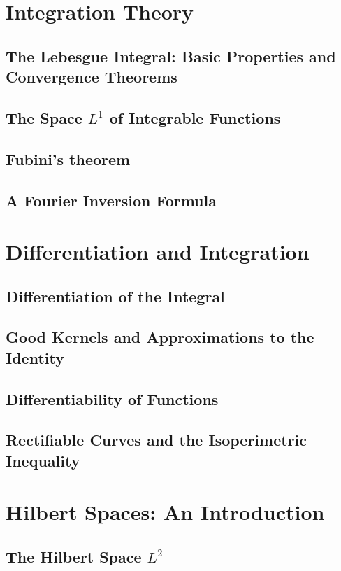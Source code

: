 \documentclass[12pt, a4paper, openany, twoside]{book}
\theoremstyle{definition}
\theoremstyle{remark}
\theoremstyle{plain}
\numberwithin{equation}{section}
\begin{document}
\newpage



\chapter{Integration Theory}
\section{The Lebesgue Integral: Basic Properties and Convergence Theorems}
\section{The Space $L^1$ of Integrable Functions}
\section{Fubini's theorem}
\section{A Fourier Inversion Formula}

\newpage

\chapter{Differentiation and Integration}
\section{Differentiation of the Integral}
\section{Good Kernels and Approximations to the Identity}
\section{Differentiability of Functions}
\section{Rectifiable Curves and the Isoperimetric Inequality}

\newpage
\chapter{Hilbert Spaces: An Introduction}
\section{The Hilbert Space $L^2$}
\end{document}
